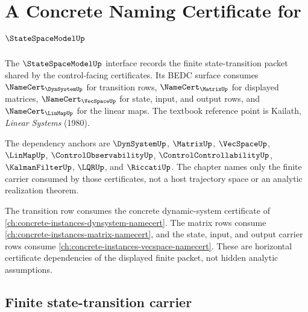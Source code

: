 \chapter{A Concrete Naming Certificate for $\StateSpaceModelUp$}
\label{ch:concrete-instances-statespacemodel-namecert}

The $\StateSpaceModelUp$ interface records the finite state-transition packet shared by the control-facing certificates. Its BEDC surface consumes $\NameCert_{\DynSystemUp}$ for transition rows, $\NameCert_{\MatrixUp}$ for displayed matrices, $\NameCert_{\VecSpaceUp}$ for state, input, and output rows, and $\NameCert_{\LinMapUp}$ for the linear maps. The textbook reference point is Kailath, \emph{Linear Systems} (1980).

The dependency anchors are $\DynSystemUp$, $\MatrixUp$, $\VecSpaceUp$, $\LinMapUp$, $\ControlObservabilityUp$, $\ControlControllabilityUp$, $\KalmanFilterUp$, $\LQRUp$, and $\RiccatiUp$. The chapter names only the finite carrier consumed by those certificates, not a host trajectory space or an analytic realization theorem.

The transition row consumes the concrete dynamic-system certificate of \autoref{ch:concrete-instances-dynsystem-namecert}. The matrix rows consume \autoref{ch:concrete-instances-matrix-namecert}, and the state, input, and output carrier rows consume \autoref{ch:concrete-instances-vecspace-namecert}. These are horizontal certificate dependencies of the displayed finite packet, not hidden analytic assumptions.

\section{Finite state-transition carrier}
\label{sec:statespacemodel-carrier}

